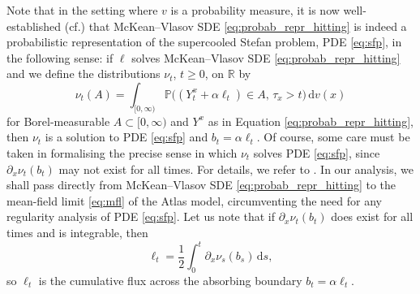 \documentclass[11pt, a4paper]{article}
\theoremstyle{plain}
\theoremstyle{definition}
\theoremstyle{remark}
\numberwithin{equation}{section}
\newcommand{\pr}{\mathbb{P}}
\newcommand{\R}{\mathbb{R}}
\renewcommand{\d}{\mathrm{d}}
\begin{document}
Note that in the setting where $v$ is a probability measure, it is now well-established (cf.\@ \cite{delarue_stefan_2022}) that McKean--Vlasov SDE \eqref{eq:probab_repr_hitting} is indeed a probabilistic representation of the supercooled Stefan problem, PDE \eqref{eq:sfp}, in the following sense: if $\ell$ solves McKean--Vlasov SDE \eqref{eq:probab_repr_hitting} and we define the distributions $\nu_t$, $t \geq 0$, on $\R$ by
\begin{equation*}
    \nu_t(A) = \int_{[0, \infty)} \pr\bigl((Y^x_t + \alpha \ell_t) \in A,\, \tau_x > t\bigr) \, \d v(x)
\end{equation*}
for Borel-measurable $A \subset [0, \infty)$ and $Y^x$ as in Equation \eqref{eq:probab_repr_hitting}, then $\nu_t$ is a solution to PDE \eqref{eq:sfp} and $b_t = \alpha \ell_t$. Of course, some care must be taken in formalising the precise sense in which $\nu_t$ solves PDE \eqref{eq:sfp}, since $\partial_x \nu_t(b_t)$ may not exist for all times. For details, we refer to \cite[Theorem 1.1]{delarue_stefan_2022}. In our analysis, we shall pass directly from McKean--Vlasov SDE \eqref{eq:probab_repr_hitting} to the mean-field limit \eqref{eq:mfl} of the Atlas model, circumventing the need for any regularity analysis of PDE \eqref{eq:sfp}. Let us note that if $\partial_x \nu_t(b_t)$ does exist for all times and is integrable, then 
\begin{equation*}
    \ell_t = \frac{1}{2} \int_0^t \partial_x \nu_s(b_s) \, \d s,
\end{equation*}
so $\ell_t$ is the cumulative flux across the absorbing boundary $b_t = \alpha \ell_t$.
\end{document}
